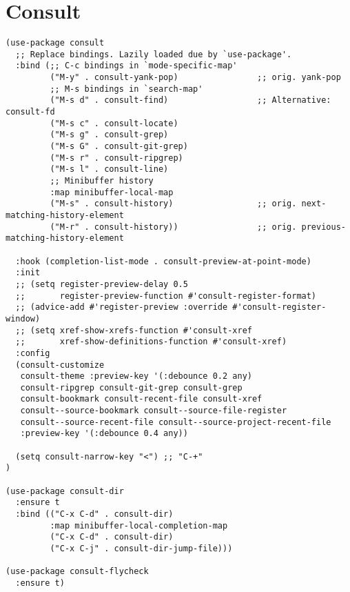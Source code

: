 \documentclass[11pt]{article}
\begin{document}
\section{Consult}
\label{sec:org2715816}
\begin{verbatim}
(use-package consult
  ;; Replace bindings. Lazily loaded due by `use-package'.
  :bind (;; C-c bindings in `mode-specific-map'
         ("M-y" . consult-yank-pop)                ;; orig. yank-pop
         ;; M-s bindings in `search-map'
         ("M-s d" . consult-find)                  ;; Alternative: consult-fd
         ("M-s c" . consult-locate)
         ("M-s g" . consult-grep)
         ("M-s G" . consult-git-grep)
         ("M-s r" . consult-ripgrep)
         ("M-s l" . consult-line)
         ;; Minibuffer history
         :map minibuffer-local-map
         ("M-s" . consult-history)                 ;; orig. next-matching-history-element
         ("M-r" . consult-history))                ;; orig. previous-matching-history-element

  :hook (completion-list-mode . consult-preview-at-point-mode)
  :init
  ;; (setq register-preview-delay 0.5
  ;;       register-preview-function #'consult-register-format)
  ;; (advice-add #'register-preview :override #'consult-register-window)
  ;; (setq xref-show-xrefs-function #'consult-xref
  ;;       xref-show-definitions-function #'consult-xref)
  :config
  (consult-customize
   consult-theme :preview-key '(:debounce 0.2 any)
   consult-ripgrep consult-git-grep consult-grep
   consult-bookmark consult-recent-file consult-xref
   consult--source-bookmark consult--source-file-register
   consult--source-recent-file consult--source-project-recent-file
   :preview-key '(:debounce 0.4 any))

  (setq consult-narrow-key "<") ;; "C-+"
)

(use-package consult-dir
  :ensure t
  :bind (("C-x C-d" . consult-dir)
         :map minibuffer-local-completion-map
         ("C-x C-d" . consult-dir)
         ("C-x C-j" . consult-dir-jump-file)))

(use-package consult-flycheck
  :ensure t)
\end{verbatim}
\end{document}
